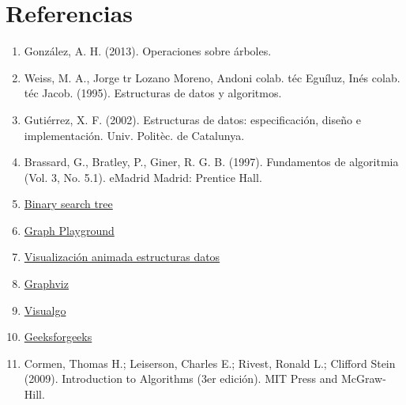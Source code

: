 \documentclass{article}
\begin{document}
    \section{Referencias}
  \begin{enumerate}
    \item González, A. H. (2013). Operaciones sobre árboles.
    \item	Weiss, M. A., Jorge tr Lozano Moreno, Andoni colab. téc Eguíluz,   Inés colab. téc Jacob. (1995). Estructuras de datos y algoritmos.
    \item	Gutiérrez, X. F. (2002). Estructuras de datos: especificación, diseño e implementación. Univ. Politèc. de Catalunya.
    \item	Brassard, G., Bratley, P., Giner, R. G. B. (1997). Fundamentos de algoritmia (Vol. 3, No. 5.1).  eMadrid Madrid: Prentice Hall.
    \item \href{https://algorithm-visualizer.org/branch-and-bound/binary-search-tree}{Binary search tree}
    \item \href{https://mikedombo.github.io/graphPlayground/}{Graph Playground}
    \item \href{https://ingenieriadesoftware.es/visualizacion-animada-estructuras-datos/}{Visualización animada estructuras datos}
    \item \href{https://graphviz.org/}{Graphviz}
    \item \href{https://visualgo.net/en/bst}{Visualgo}
    \item \href{https://www.geeksforgeeks.org/}{Geeksforgeeks}
    \item Cormen, Thomas H.; Leiserson, Charles E.; Rivest, Ronald L.; Clifford Stein (2009). Introduction to Algorithms (3er edición). MIT Press and McGraw-Hill.
  \end{enumerate}
\end{document}
